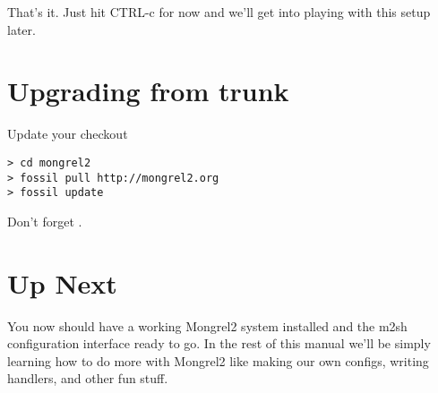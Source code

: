 That's it.  Just hit CTRL-c for now and we'll get into playing with this
setup later.

\section{Upgrading from trunk}
\begin{code}{Update your checkout}
\begin{verbatim}
> cd mongrel2
> fossil pull http://mongrel2.org
> fossil update
\end{verbatim}
\end{code}

Don't forget .


\section{Up Next}

You now should have a working Mongrel2 system installed and the m2sh configuration
interface ready to go.  In the rest of this manual we'll be simply learning how
to do more with Mongrel2 like making our own configs, writing handlers, and other
fun stuff.

